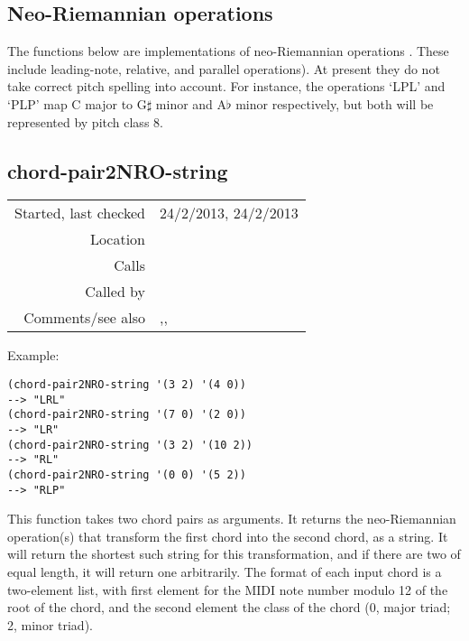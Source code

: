 \subsection{Neo-Riemannian operations}\label{sec:NRO}

The functions below are implementations of
neo-Riemannian operations \citep*{lewin1987,cohn1998}.
These include leading-note, relative, and parallel
operations). At present they do not take correct pitch
spelling into account. For instance, the operations
`LPL' and `PLP' map C major to G$\sharp$ minor and
A$\flat$ minor respectively, but both will be
represented by pitch class 8.


\subsection*{chord-pair2NRO-string}\label{fun:chord-pair2NRO-string}

\vspace{0.3cm}
\begin{tabular}{r|p{8cm}}
Started, last checked & 24/2/2013, 24/2/2013 \\
Location & \nameref{sec:NRO} \\
Calls & \\
Called by & \nameref{fun:chord-pairs2NRO-strings} \\
Comments/see also & \nameref{fun:chord-pairs2NRO-strings},\newline \nameref{fun:NRO-string2chord-pairs},\newline \nameref{fun:NRO-strings2chord-pairs}
\end{tabular}

\vspace{0.5cm}
\noindent Example:
\begin{verbatim}
(chord-pair2NRO-string '(3 2) '(4 0))
--> "LRL"
(chord-pair2NRO-string '(7 0) '(2 0))
--> "LR"
(chord-pair2NRO-string '(3 2) '(10 2))
--> "RL"
(chord-pair2NRO-string '(0 0) '(5 2))
--> "RLP"
\end{verbatim}

\noindent This function takes two chord pairs as
arguments. It returns the neo-Riemannian operation(s)
that transform the first chord into the second chord,
as a string. It will return the shortest such string
for this transformation, and if there are two of
equal length, it will return one arbitrarily. The
format of each input chord is a two-element list, with
first element for the MIDI note number modulo 12 of
the root of the chord, and the second element the
class of the chord (0, major triad; 2, minor
triad).


